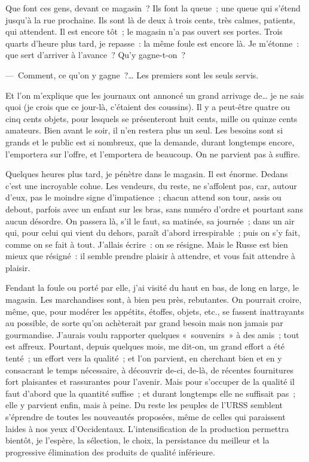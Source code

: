 \documentclass[french,twoside]{book} %
\newcommand{\astermono}{\medskip\centerline{\color{rubric}\large\selectfont{\syms ✻}}\medskip\par}%
\begin{document}
\astermono

\noindent Que font ces gens, devant ce magasin ? Ils font la queue ; une queue qui s’étend jusqu’à la rue prochaine. Ils sont là de deux à trois cents, très calmes, patients, qui attendent. Il est encore tôt ; le magasin n’a pas ouvert ses portes. Trois quarts d’heure plus tard, je repasse : la même foule est encore là. Je m’étonne : que sert d’arriver à l’avance ? Qu’y gagne-t-on ?\par
— Comment, ce qu’on y gagne ?… Les premiers sont les seuls servis.\par
Et l’on m’explique que les journaux ont annoncé un grand arrivage de… je ne sais quoi (je crois que ce jour-là, c’étaient des coussins). Il y a peut-être quatre ou cinq cents objets, pour lesquels se présenteront huit cents, mille ou quinze cents amateurs. Bien avant le soir, il n’en restera plus un seul. Les besoins sont si grands et le public est si nombreux, que la demande, durant longtemps encore, l’emportera sur l’offre, et l’emportera de beaucoup. On ne parvient pas à suffire.\par
Quelques heures plus tard, je pénètre dans le magasin. Il est énorme. Dedans c’est une incroyable cohue. Les vendeurs, du reste, ne s’affolent pas, car, autour d’eux, pas le moindre signe d’impatience ; chacun attend son tour, assis ou debout, parfois avec un enfant sur les bras, sans numéro d’ordre et pourtant sans aucun désordre. On passera là, s’il le faut, sa matinée, sa journée ; dans un air qui, pour celui qui vient du dehors, paraît d’abord irrespirable ; puis on s’y fait, comme on se fait à tout. J’allais écrire : on se résigne. Mais le Russe est bien mieux que résigné : il semble prendre plaisir à attendre, et vous fait attendre à plaisir.\par
Fendant la foule ou porté par elle, j’ai visité du haut en bas, de long en large, le magasin. Les marchandises sont, à bien peu près, rebutantes. On pourrait croire, même, que, pour modérer les appétits, étoffes, objets, etc., se fassent inattrayants au possible, de sorte qu’on achèterait par grand besoin mais non jamais par gourmandise. J’aurais voulu rapporter quelques « souvenirs » à des amis ; tout est affreux. Pourtant, depuis quelques mois, me dit-on, un grand effort a été tenté ; un effort vers la qualité ; et l’on parvient, en cherchant bien et en y consacrant le temps nécessaire, à découvrir de-ci, de-là, de récentes fournitures fort plaisantes et rassurantes pour l’avenir. Mais pour s’occuper de la qualité il faut d’abord que la quantité suffise ; et durant longtemps elle ne suffisait pas ; elle y parvient enfin, mais à peine. Du reste les peuples de l’URSS semblent s’éprendre de toutes les nouveautés proposées, même de celles qui paraissent laides à nos yeux d’Occidentaux. L’intensification de la production permettra bientôt, je l’espère, la sélection, le choix, la persistance du meilleur et la progressive élimination des produits de qualité inférieure.\par
\end{document}
